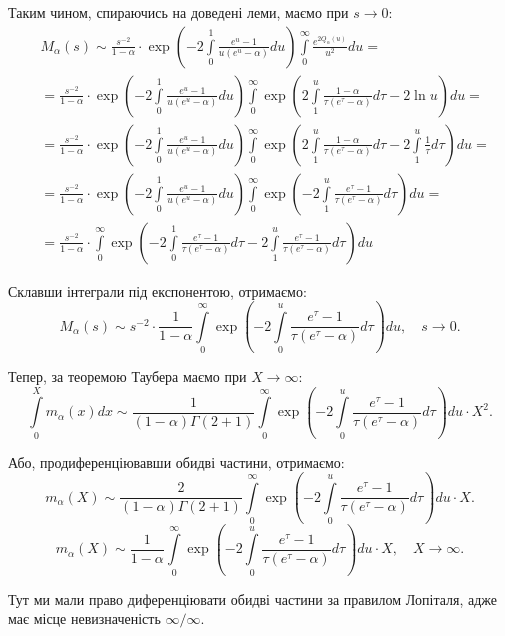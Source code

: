 Таким чином, спираючись на доведені леми, маємо при $s \rightarrow 0$:
\begin{align*}
&M_\alpha(s) \sim \frac{s^{-2}}{1-\alpha} \cdot \exp\left(-2\int\limits_0^1 \frac{e^u  - 1}{u(e^u - \alpha)} du\right) \int\limits_0^\infty \frac{e^{2Q_\alpha(u)}}{u^2} du = \\
& = \frac{s^{-2}}{1-\alpha} \cdot \exp\left(-2\int\limits_0^1 \frac{e^u  - 1}{u(e^u - \alpha)} du\right) \int\limits_0^\infty \exp\left(2\int\limits_1^u \frac{1- \alpha}{\tau(e^\tau - \alpha)} d\tau - 2 \ln u\right) du = \\
& = \frac{s^{-2}}{1-\alpha} \cdot \exp\left(-2\int\limits_0^1 \frac{e^u  - 1}{u(e^u - \alpha)} du\right) \int\limits_0^\infty \exp\left(2\int\limits_1^u \frac{1- \alpha}{\tau(e^\tau - \alpha)} d\tau - 2  \int\limits_1^u  \frac{1}{\tau} d\tau \right) du = \\
& = \frac{s^{-2}}{1-\alpha} \cdot \exp\left(-2\int\limits_0^1 \frac{e^u  - 1}{u(e^u - \alpha)} du\right) \int\limits_0^\infty \exp\left(-2\int\limits_1^u \frac{e^{\tau} - 1}{\tau(e^\tau - \alpha)} d\tau  \right) du = \\
& = \frac{s^{-2}}{1-\alpha} \cdot \int\limits_0^\infty \exp\left( -2\int\limits_0^1 \frac{e^{\tau} - 1}{\tau(e^\tau - \alpha)} d\tau -2\int\limits_1^u \frac{e^{\tau} - 1}{\tau(e^\tau - \alpha)} d\tau  \right) du 
\end{align*}

Склавши інтеграли під експонентою, отримаємо:
\begin{equation}
	M_\alpha(s) \sim s^{-2} \cdot \frac{1}{1-\alpha} \int\limits_0^\infty \exp\left( -2\int\limits_0^u \frac{e^{\tau} - 1}{\tau(e^\tau - \alpha)} d\tau  \right) du, \quad s \rightarrow 0.
\end{equation}

Тепер, за теоремою Таубера маємо при $X \rightarrow \infty$:
\begin{equation}
	\int\limits_0^X m_\alpha(x) dx \sim \frac{1}{(1-\alpha)\Gamma(2 + 1)} \int\limits_0^\infty \exp\left( -2\int\limits_0^u \frac{e^{\tau} - 1}{\tau(e^\tau - \alpha)} d\tau  \right) du \cdot X^2.
\end{equation}

Або, продиференціювавши обидві частини,  отримаємо:
\begin{equation}
	m_\alpha(X) \sim \frac{2}{(1- \alpha) \Gamma(2 + 1)} \int\limits_0^\infty \exp\left( -2\int\limits_0^u \frac{e^{\tau} - 1}{\tau(e^\tau - \alpha)} d\tau  \right) du \cdot X.
\end{equation}
\begin{equation}
	\label{eq:uniform_right_final}
	m_\alpha(X) \sim \frac{1}{1-\alpha} \int\limits_0^\infty \exp\left( -2\int\limits_0^u \frac{e^{\tau} - 1}{\tau(e^\tau - \alpha)} d\tau  \right) du \cdot X, \quad X \rightarrow \infty.
\end{equation}

Тут ми мали право диференціювати обидві частини за правилом Лопіталя, адже має місце невизначеність $\infty / \infty$.

